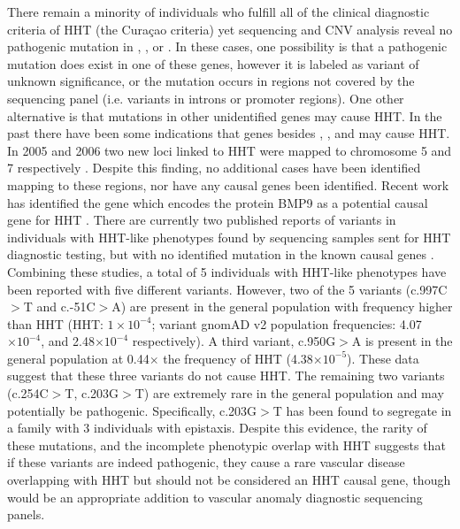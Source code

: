 There remain a minority of individuals who fulfill all of the clinical diagnostic criteria of HHT (the Cura\c{c}ao criteria) yet sequencing and CNV analysis reveal no pathogenic mutation in , , or . In these cases, one possibility is that a pathogenic mutation does exist in one of these genes, however it is labeled as variant of unknown significance, or the mutation occurs in regions not covered by the sequencing panel (i.e. variants in introns or promoter regions). One other alternative is that mutations in other unidentified genes may cause HHT. In the past there have been some indications that genes besides , , and  may cause HHT. In 2005 and 2006 two new loci linked to HHT were mapped to chromosome 5 and 7 respectively \citep{cole2005, bayraktoydemir2006}. Despite this finding, no additional cases have been identified mapping to these regions, nor have any causal genes been identified. Recent work has identified the gene  which encodes the protein BMP9 as a potential causal gene for HHT \citep{wooderchakdonahue2013}. There are currently two published reports of  variants in individuals with HHT-like phenotypes found by sequencing samples sent for HHT diagnostic testing, but with no identified mutation in the known causal genes \citep{wooderchakdonahue2013, hernandez2015}. Combining these studies, a total of 5 individuals with HHT-like phenotypes have been reported with five different  variants. However, two of the 5 variants (c.997C$>$T and c.-51C$>$A) are present in the general population with frequency higher than HHT (HHT: $1\times 10^{-4}$; variant gnomAD v2 population frequencies: 4.07$\times 10^{-4}$, and 2.48$\times 10^{-4}$ respectively). A third variant, c.950G$>$A is present in the general population at 0.44$\times$ the frequency of HHT (4.38$\times 10^{-5}$). These data suggest that these three variants do not cause HHT. The remaining two variants (c.254C$>$T, c.203G$>$T) are extremely rare in the general population and may potentially be pathogenic. Specifically, c.203G$>$T has been found to segregate in a family with 3 individuals with epistaxis. Despite this evidence, the rarity of these mutations, and the incomplete phenotypic overlap with HHT suggests that if these variants are indeed pathogenic, they cause a rare vascular disease overlapping with HHT but should not be considered an HHT causal gene, though  would be an appropriate addition to vascular anomaly diagnostic sequencing panels. 

